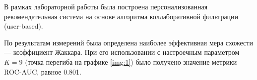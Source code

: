 
В рамках лабораторной работы была построена персонализованная рекомендательная система на основе алгоритма коллаборативной фильтрации (user-based).

По результатам измерений была определена наиболее эффективная мера схожести --- коэффициент Жаккара. При его использовании с настроечным параметром $K=9$ (точка перегиба на графике \ref{img:1}) было получено значение метрики ROC-AUC, равное 0.801.
